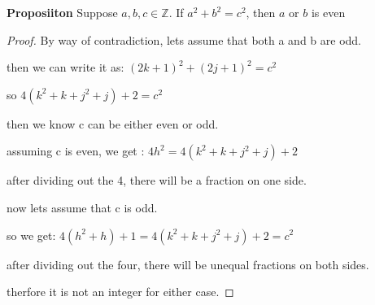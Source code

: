 \documentclass[12pt]{article}
\def\Z{\mathbb Z}
\begin{document}
{\bf Proposiiton} Suppose $a,b,c \in \Z$. If $a^2+b^2=c^2$, then $a$ or $b$ is even
\begin{proof}

    By way of contradiction, lets assume that both a and b are odd.

    then we can write it as: $(2k+1)^2+(2j+1)^2=c^2$

    so $4(k^2+k+j^2+j)+2=c^2$

    then we know c can be either even or odd.

    assuming c is even, we get : $4h^2=4(k^2+k+j^2+j)+2$

    after dividing out the 4, there will be a fraction on one side.

    now lets assume that c is odd.

    so we get: $4(h^2+h)+1=4(k^2+k+j^2+j)+2=c^2$

    after dividing out the four, there will be unequal fractions on both sides.

    therfore it is not an integer for either case.

\end{proof}
\end{document}
